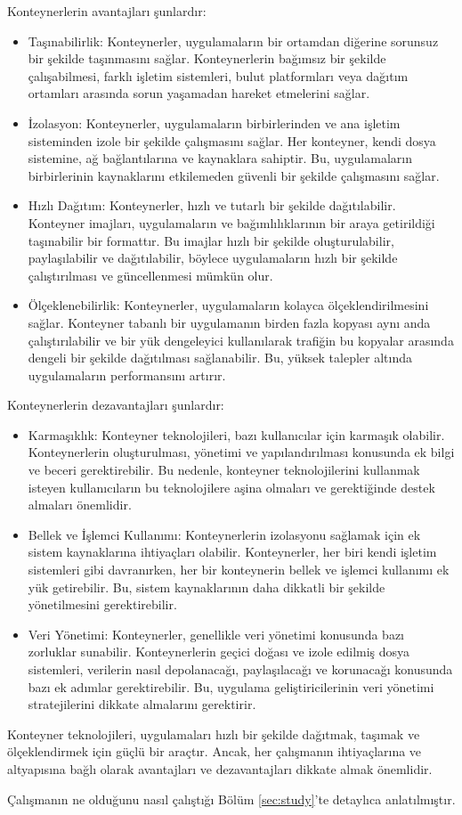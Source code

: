 Konteynerlerin avantajları şunlardır:
\begin{itemize}
  \item Taşınabilirlik: Konteynerler, uygulamaların bir ortamdan diğerine sorunsuz bir şekilde taşınmasını sağlar. Konteynerlerin bağımsız bir şekilde çalışabilmesi, farklı işletim sistemleri, bulut platformları veya dağıtım ortamları arasında sorun yaşamadan hareket etmelerini sağlar.
  \item İzolasyon: Konteynerler, uygulamaların birbirlerinden ve ana işletim sisteminden izole bir şekilde çalışmasını sağlar. Her konteyner, kendi dosya sistemine, ağ bağlantılarına ve kaynaklara sahiptir. Bu, uygulamaların birbirlerinin kaynaklarını etkilemeden güvenli bir şekilde çalışmasını sağlar.
  \item Hızlı Dağıtım: Konteynerler, hızlı ve tutarlı bir şekilde dağıtılabilir. Konteyner imajları, uygulamaların ve bağımlılıklarının bir araya getirildiği taşınabilir bir formattır. Bu imajlar hızlı bir şekilde oluşturulabilir, paylaşılabilir ve dağıtılabilir, böylece uygulamaların hızlı bir şekilde çalıştırılması ve güncellenmesi mümkün olur.
  \item Ölçeklenebilirlik: Konteynerler, uygulamaların kolayca ölçeklendirilmesini sağlar. Konteyner tabanlı bir uygulamanın birden fazla kopyası aynı anda çalıştırılabilir ve bir yük dengeleyici kullanılarak trafiğin bu kopyalar arasında dengeli bir şekilde dağıtılması sağlanabilir. Bu, yüksek talepler altında uygulamaların performansını artırır.
\end{itemize}

Konteynerlerin dezavantajları şunlardır:
\begin{itemize}
  \item Karmaşıklık: Konteyner teknolojileri, bazı kullanıcılar için karmaşık olabilir. Konteynerlerin oluşturulması, yönetimi ve yapılandırılması konusunda ek bilgi ve beceri gerektirebilir. Bu nedenle, konteyner teknolojilerini kullanmak isteyen kullanıcıların bu teknolojilere aşina olmaları ve gerektiğinde destek almaları önemlidir.
  \item Bellek ve İşlemci Kullanımı: Konteynerlerin izolasyonu sağlamak için ek sistem kaynaklarına ihtiyaçları olabilir. Konteynerler, her biri kendi işletim sistemleri gibi davranırken, her bir konteynerin bellek ve işlemci kullanımı ek yük getirebilir. Bu, sistem kaynaklarının daha dikkatli bir şekilde yönetilmesini gerektirebilir.
  \item Veri Yönetimi: Konteynerler, genellikle veri yönetimi konusunda bazı zorluklar sunabilir. Konteynerlerin geçici doğası ve izole edilmiş dosya sistemleri, verilerin nasıl depolanacağı, paylaşılacağı ve korunacağı konusunda bazı ek adımlar gerektirebilir. Bu, uygulama geliştiricilerinin veri yönetimi stratejilerini dikkate almalarını gerektirir.
\end{itemize}

Konteyner teknolojileri, uygulamaları hızlı bir şekilde dağıtmak, taşımak ve ölçeklendirmek için güçlü bir araçtır. Ancak, her çalışmanın ihtiyaçlarına ve altyapısına bağlı olarak avantajları ve dezavantajları dikkate almak önemlidir.

Çalışmanın ne olduğunu nasıl çalıştığı Bölüm \ref{sec:study}'te detaylıca anlatılmıştır.